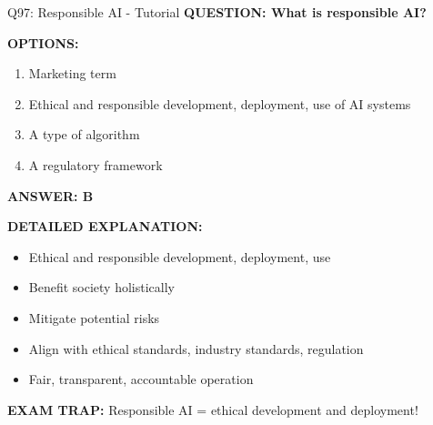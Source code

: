 \documentclass[8pt]{beamer}
\begin{document}
	\begin{frame}{Q97: Responsible AI - Tutorial}
		\fontsize{6.5}{7.5}\selectfont
		\textbf{QUESTION: What is responsible AI?}
		
		\vspace{0.1cm}
		\textbf{OPTIONS:}
		\begin{enumerate}
			\item Marketing term
			\item Ethical and responsible development, deployment, use of AI systems
			\item A type of algorithm
			\item A regulatory framework
		\end{enumerate}
		
		\vspace{0.1cm}
		\textcolor{myblue}{\textbf{ANSWER: B}}
		
		\vspace{0.1cm}
		\textbf{DETAILED EXPLANATION:}
		\begin{itemize}
			\item Ethical and responsible development, deployment, use
			\item Benefit society holistically
			\item Mitigate potential risks
			\item Align with ethical standards, industry standards, regulation
			\item Fair, transparent, accountable operation
		\end{itemize}
		
		\vspace{0.1cm}
		\textcolor{myred}{\textbf{EXAM TRAP:}} Responsible AI = \textcolor{myblue}{ethical development and deployment}!
	\end{frame}
	
\end{document}

